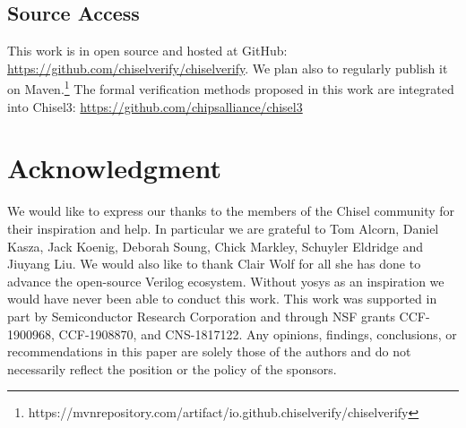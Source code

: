 \documentclass[conference]{IEEEtran}
\begin{document}
\subsection*{Source Access}

This work is in open source and hosted at GitHub:\\ \url{https://github.com/chiselverify/chiselverify}.
We plan also to regularly publish it on Maven.\footnote{https://mvnrepository.com/artifact/io.github.chiselverify/chiselverify}
The formal verification methods proposed in this work are integrated into Chisel3: \url{https://github.com/chipsalliance/chisel3}


\section*{Acknowledgment}
We would like to express our thanks to the members of the Chisel community for their 
inspiration and help. %
In particular we are grateful to Tom Alcorn, Daniel Kasza, Jack Koenig, Deborah Soung,
Chick Markley, Schuyler Eldridge and Jiuyang Liu.
We would also like to thank Clair Wolf for all she has done to advance the open-source Verilog ecosystem.
Without yosys as an inspiration we would have never been able to conduct this work.
This work was supported in part by Semiconductor Research Corporation and through NSF grants CCF-1900968, CCF-1908870, and CNS-1817122.
Any opinions, findings, conclusions, or recommendations in this
paper are solely those of the authors and do not necessarily
reflect the position or the policy of the sponsors.



\end{document}
